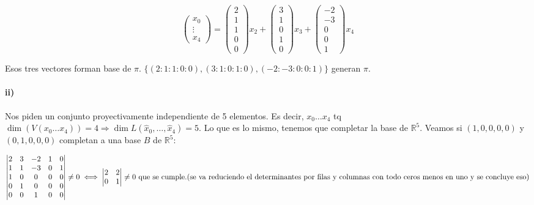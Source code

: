 {\[ \begin{pmatrix} x_0 \\ \vdots \\ x_4 \end{pmatrix} = \begin{pmatrix} 2 \\ 1 \\ 1 \\ 0 \\ 0 \end{pmatrix} x_2 + \begin{pmatrix} 3 \\ 1 \\ 0 \\ 1 \\ 0 \end{pmatrix} x_3 + \begin{pmatrix} -2 \\ -3 \\ 0 \\ 0 \\ 1 \end{pmatrix} x_4 \]

Esos tres vectores forman base de $\pi$.  $\{(2:1:1:0:0), (3:1:0:1:0), (-2:-3:0:0:1)\}$ generan $\pi$.

\paragraph{ii)} Nos piden un conjunto proyectivamente independiente de 5 elementos. Es decir, $x_0 \dots x_4$ tq $\dim(V(x_0 \dots x_4)) = 4 \Rightarrow \dim L(\hat{x}_0, \dots, \hat{x}_4) = 5$. Lo que es lo mismo, tenemos que completar la base de $\mathbb{R}^5$. Veamos si $(1,0,0,0,0)$ y $(0,1,0,0,0)$ completan a una base $B$ de $\mathbb{R}^5$:

\[ \begin{vmatrix} 2 & 3 & -2 & 1 & 0 \\ 1 & 1 & -3 & 0 & 1 \\ 1 & 0 & 0 & 0 & 0 \\ 0 & 1 & 0 & 0 & 0 \\ 0 & 0 & 1 & 0 & 0 \end{vmatrix} \neq 0 \iff \begin{vmatrix} 2 & 2 \\ 0 & 1 \end{vmatrix} \neq 0 \text{ que se cumple.} \\\text{(se va reduciendo el determinantes por filas y
 columnas con todo ceros menos en uno y se concluye eso)} \]

}
